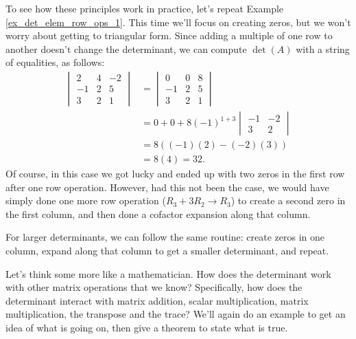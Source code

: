 To see how these principles work in practice, let's repeat Example \ref{ex_det_elem_row_ops_1}. This time we'll focus on creating zeros, but we won't worry about getting to triangular form. Since adding a multiple of one row to another doesn't change the determinant, we can compute $\det(A)$ with a string of equalities, as follows:
\begin{align*}
\begin{vmatrix}
2&4&-2\\-1&2&5\\3&2&1
\end{vmatrix} &= \begin{vmatrix}
0&0&8\\-1&2&5\\3&2&1
\end{vmatrix} \tag*{(Add $2R_2$ to $R_1$)}\\
& = 0+0+8(-1)^{1+3}\begin{vmatrix}
-1&-2\\3&2
\end{vmatrix} \tag*{(Expand along Row 1)}\\
& = 8((-1)(2)-(-2)(3))\\
& = 8(4)=32.
\end{align*}
Of course, in this case we got lucky and ended up with two zeros in the first row after one row operation. However, had this not been the case, we would have simply done one more row operation ($R_3+3R_2\to R_3$) to create a second zero in the first column, and then done a cofactor expansion along that column.

For larger determinants, we can follow the same routine: create zeros in one column, expand along that column to get a smaller determinant, and repeat.

Let's think some more like a mathematician. How does the determinant work with other matrix operations that we know? Specifically, how does the determinant interact with matrix addition, scalar multiplication, matrix multiplication, the transpose and the trace? We'll again do an example to get an idea of what is going on, then give a theorem to state what is true.

\medskip

